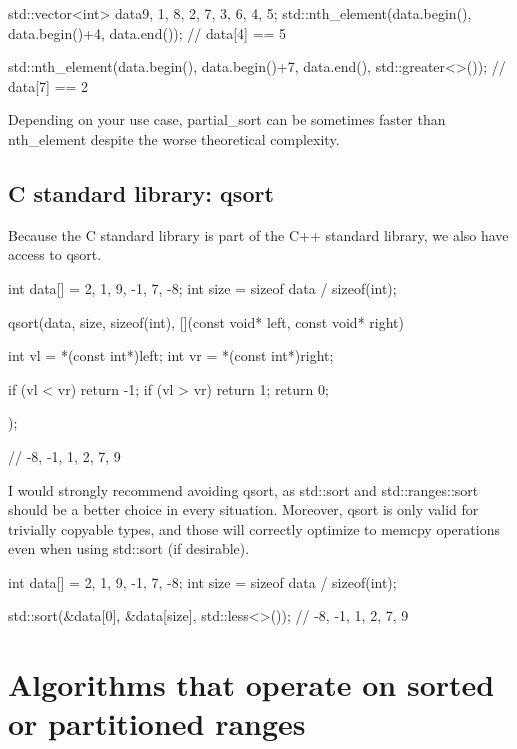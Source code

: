 \begin{box-note}
\begin{cppcode}
std::vector<int> data{9, 1, 8, 2, 7, 3, 6, 4, 5};
std::nth_element(data.begin(), data.begin()+4, data.end());
// data[4] == 5

std::nth_element(data.begin(), data.begin()+7, data.end(), std::greater<>());
// data[7] == 2
\end{cppcode}
\end{box-note}

Depending on your use case, partial\_sort can be sometimes faster than nth\_element despite the worse theoretical complexity.

\subsection{C standard library: qsort}

Because the C standard library is part of the C++ standard library, we also have access to qsort.

\begin{box-note}
\begin{cppcode}
int data[] = {2, 1, 9, -1, 7, -8};
int size = sizeof data / sizeof(int);

qsort(data, size, sizeof(int), [](const void* left, const void* right){
    int vl = *(const int*)left;
    int vr = *(const int*)right;

    if (vl < vr) return -1;
    if (vl > vr) return 1;
    return 0;
});

// -8, -1, 1, 2, 7, 9
\end{cppcode}
\end{box-note}

I would strongly recommend avoiding qsort, as std::sort and std::ranges::sort should be a better choice in every situation. Moreover, qsort is only valid for trivially copyable types, and those will correctly optimize to memcpy operations even when using std::sort (if desirable).

\begin{box-note}
\begin{cppcode}
int data[] = {2, 1, 9, -1, 7, -8};
int size = sizeof data / sizeof(int);

std::sort(&data[0], &data[size], std::less<>());
// -8, -1, 1, 2, 7, 9
\end{cppcode}
\end{box-note}

\section{Algorithms that operate on sorted or partitioned ranges}

